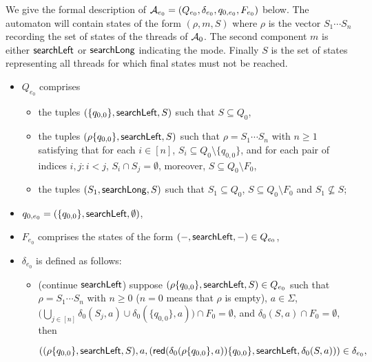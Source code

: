 We give the formal description of $\mathcal{A}_{e_0}=(Q_{e_0}, \delta_{e_0}, q_{0,e_0}, F_{e_0})$ below.
The automaton will contain states of the form $(\rho, m, S)$ where $\rho$ is the vector $S_1\cdots S_n$ recording the set of states of the threads of $\mathcal{A}_0$. The second component $m$ is either $\mathsf{searchLeft}$ or $\mathsf{searchLong}$ indicating the mode.
Finally $S$ is the set of states representing all threads for which final states must not be reached.
\begin{itemize}
	\item $Q_{e_0}$ comprises
	\begin{itemize}
		\item the tuples $(\{q_{0,0}\}, \mathsf{searchLeft}, S)$ such that $S \subseteq Q_0$,
		\item the tuples $(\rho \{q_{0,0}\}, \mathsf{searchLeft}, S)$ such that  $\rho = S_1 \cdots S_n$ with $n \ge 1$ satisfying that for each $i \in [n]$, $S_i \subseteq Q_0 \setminus \{q_{0,0}\}$, and for each pair of indices $i, j: i < j$, $S_i \cap S_j = \emptyset$, moreover, $S \subseteq Q_0 \setminus F_0$,
		\item the tuples $(S_1, \mathsf{searchLong}, S)$ such that $S_1 \subseteq Q_0$, $S \subseteq Q_0 \setminus F_0$ and $S_1 \not \subseteq S$;
	\end{itemize}
	\item $q_{0,e_0}= (\{q_{0,0}\}, \mathsf{searchLeft}, \emptyset)$,
	\item $F_{e_0}$ comprises the states of the form $(-, \mathsf{searchLeft}, -) \in Q_{e_0}$,
	\item $\delta_{e_0}$ is defined as follows:
	\begin{itemize}
		\item (continue $\mathsf{searchLeft}$) suppose $(\rho \{q_{0,0}\}, \mathsf{searchLeft}, S) \in Q_{e_0}$ such that $\rho = S_1 \cdots S_n$ with $n \ge 0$  ($n = 0$ means that $\rho$ is empty), $a \in \Sigma$, $\big(\bigcup \limits_{j \in [n]} \delta_0(S_j, a) \cup \delta_0(\{q_{0,0}\},a)\big) \cap F_0 = \emptyset$, and $\delta_0(S,a) \cap F_0 = \emptyset$, then
		\medskip

		\hspace{5mm} $\left((\rho  \{q_{0,0}\}, \mathsf{searchLeft}, S), a, \left(\mathsf{red}(\delta_0(\rho\{q_{0,0}\}, a)) \{q_{0,0}\}, \mathsf{searchLeft}, \delta_0(S,a) \right) \right) \in \delta_{e_0},$


\end{itemize}
\end{itemize}
